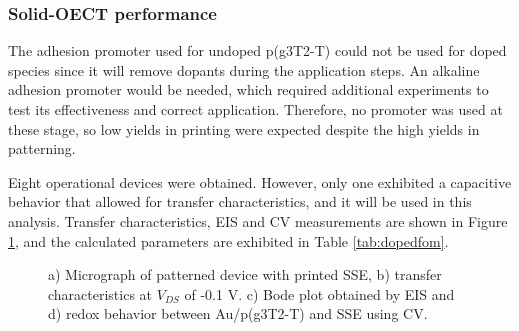 \subsubsection{Solid-OECT performance}

The adhesion promoter used for undoped p(g3T2-T) could not be used for doped species since it will remove dopants during the application steps. An alkaline adhesion promoter would be needed, which required additional experiments to test its effectiveness and correct application. Therefore, no promoter was used at these stage, so low yields in printing were expected despite the high yields in patterning.

Eight operational devices were obtained. However, only one exhibited a capacitive behavior that allowed for transfer characteristics, and it will be used in this analysis. Transfer characteristics, EIS and CV measurements are shown in Figure \ref{fig:dopedSSE}, and the calculated parameters are exhibited in Table \ref{tab:dopedfom}.

\begin{figure}[ht]
    \centering
    \qquad
    \caption[Performance of solid-OECT with doped-p(g3T2-T)]{a) Micrograph of patterned device with printed SSE, b) transfer characteristics at $V_{DS}$ of -0.1 V. c) Bode plot obtained by EIS and d) redox behavior between Au/p(g3T2-T) and SSE using CV.}
    \label{fig:dopedSSE}
\end{figure}

